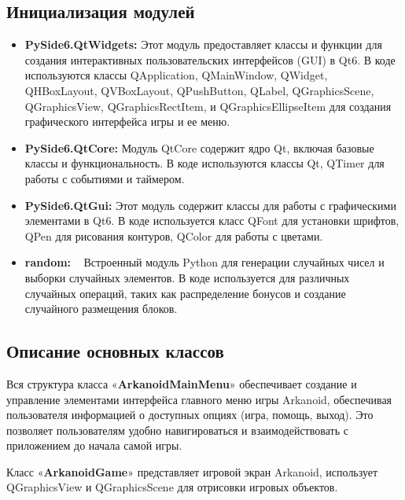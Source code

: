 \subsection{\label{subsec:ch02/sec02/sub01}Инициализация модулей}
\begin{itemize}
    \item \textbf{PySide6.QtWidgets:}
    Этот модуль предоставляет классы и функции для создания интерактивных пользовательских интерфейсов (GUI) в Qt6. В коде используются классы QApplication, QMainWindow, QWidget, QHBoxLayout, QVBoxLayout, QPushButton, QLabel, QGraphicsScene, QGraphicsView, QGraphicsRectItem, и QGraphicsEllipseItem для создания графического интерфейса игры и ее меню.

    \item \textbf{PySide6.QtCore:}
    Модуль QtCore содержит ядро Qt, включая базовые классы и функциональность. В коде используются классы Qt, QTimer для работы с событиями и таймером.

    \item \textbf{PySide6.QtGui:} 
    Этот модуль содержит классы для работы с графическими элементами в Qt6. В коде используется класс QFont для установки шрифтов, QPen для рисования контуров, QColor для работы с цветами.

    \item \textbf{random:} ~\cite{wikigeeksforgeeks}
    Встроенный модуль Python для генерации случайных чисел и выборки случайных элементов. В коде используется для различных случайных операций, таких как распределение бонусов и создание случайного размещения блоков.
    
\end{itemize}



\subsection{\label{subsec:ch02/sec02/sub02}Описание основных классов}
Вся структура класса «\textbf{ArkanoidMainMenu}» обеспечивает создание и управление элементами интерфейса главного меню игры Arkanoid, обеспечивая пользователя информацией о доступных опциях (игра, помощь, выход). Это позволяет пользователям удобно навигироваться и взаимодействовать с приложением до начала самой игры. 

Класс «\textbf{ArkanoidGame}» представляет игровой экран Arkanoid, использует QGraphicsView и QGraphicsScene для отрисовки игровых объектов.

